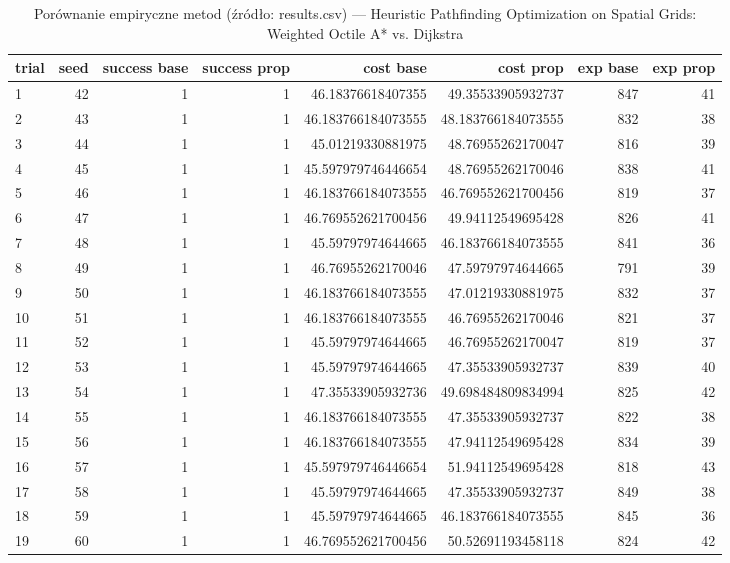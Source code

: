 \documentclass[conference]{IEEEtran}
\renewcommand{\texttt}[1]{{\normalfont\ttfamily #1}}
\begin{document}
\begin{table}[htbp]
\centering
\caption{Porównanie empiryczne metod (źródło: \texttt{results.csv}) --- Heuristic Pathfinding Optimization on Spatial Grids: Weighted Octile A* vs. Dijkstra}
\begin{tabular}{lrrrrrrr}
\toprule
\textbf{trial} & \textbf{seed} & \textbf{success base} & \textbf{success prop} & \textbf{cost base} & \textbf{cost prop} & \textbf{exp base} & \textbf{exp prop} \\
\midrule
1 & 42 & 1 & 1 & 46.18376618407355 & 49.35533905932737 & 847 & 41 \\
2 & 43 & 1 & 1 & 46.183766184073555 & 48.183766184073555 & 832 & 38 \\
3 & 44 & 1 & 1 & 45.01219330881975 & 48.76955262170047 & 816 & 39 \\
4 & 45 & 1 & 1 & 45.597979746446654 & 48.76955262170046 & 838 & 41 \\
5 & 46 & 1 & 1 & 46.183766184073555 & 46.769552621700456 & 819 & 37 \\
6 & 47 & 1 & 1 & 46.769552621700456 & 49.94112549695428 & 826 & 41 \\
7 & 48 & 1 & 1 & 45.59797974644665 & 46.183766184073555 & 841 & 36 \\
8 & 49 & 1 & 1 & 46.76955262170046 & 47.59797974644665 & 791 & 39 \\
9 & 50 & 1 & 1 & 46.183766184073555 & 47.01219330881975 & 832 & 37 \\
10 & 51 & 1 & 1 & 46.183766184073555 & 46.76955262170046 & 821 & 37 \\
11 & 52 & 1 & 1 & 45.59797974644665 & 46.76955262170047 & 819 & 37 \\
12 & 53 & 1 & 1 & 45.59797974644665 & 47.35533905932737 & 839 & 40 \\
13 & 54 & 1 & 1 & 47.35533905932736 & 49.698484809834994 & 825 & 42 \\
14 & 55 & 1 & 1 & 46.183766184073555 & 47.35533905932737 & 822 & 38 \\
15 & 56 & 1 & 1 & 46.183766184073555 & 47.94112549695428 & 834 & 39 \\
16 & 57 & 1 & 1 & 45.597979746446654 & 51.94112549695428 & 818 & 43 \\
17 & 58 & 1 & 1 & 45.59797974644665 & 47.35533905932737 & 849 & 38 \\
18 & 59 & 1 & 1 & 45.59797974644665 & 46.183766184073555 & 845 & 36 \\
19 & 60 & 1 & 1 & 46.769552621700456 & 50.52691193458118 & 824 & 42 \\

\end{tabular}
\end{table}
\end{document}
